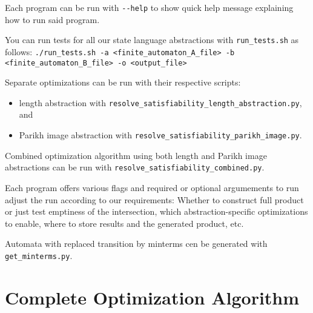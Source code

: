 Each program can be run with \texttt{-\--help} to show quick help message explaining how to run said program.

You can run tests for all our state language abstractions with \texttt{run\_tests.sh} as follows:
{
    \centering \footnotesize \texttt{./run\_tests.sh -a <finite\_automaton\_A\_file> -b <finite\_automaton\_B\_file> -o <output\_file>}
}

Separate optimizations can be run with their respective scripts:
\begin{itemize}
    \item length abstraction with \texttt{resolve\_satisfiability\_length\_abstraction.py}, and
    \item Parikh image abstraction with \texttt{resolve\_satisfiability\_parikh\_image.py}.
\end{itemize}
Combined optimization algorithm using both length and Parikh image abstractions can be run with \texttt{resolve\_satisfiability\_combined.py}.

Each program offers various flags and required or optional argumements to run adjust the run according to our requirements: Whether to construct full product or just test emptiness of the intersection, which abstraction-specific optimizations to enable, where to store results and the generated product, etc.

Automata with replaced transition by minterms cen be generated with \texttt{get\_minterms.py}.








\chapter{Complete Optimization Algorithm}

